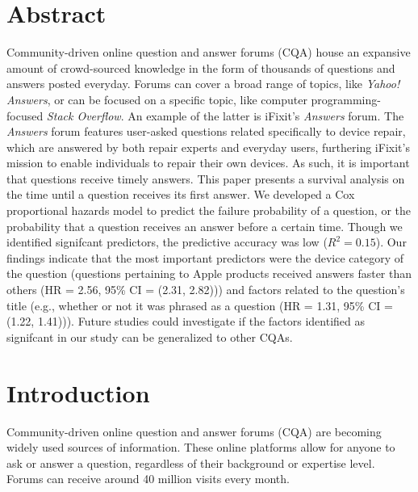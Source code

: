 \documentclass{article}
\begin{document}




\section*{Abstract}

Community-driven online question and answer forums (CQA) house an expansive amount of crowd-sourced knowledge in the form of thousands of questions and answers posted everyday. Forums can cover a broad range of topics, like \textit{Yahoo! Answers}, or can be focused on a specific topic, like computer programming-focused \textit{Stack Overflow}. An example of the latter is iFixit's \textit{Answers} forum. The \textit{Answers} forum features user-asked questions related specifically to device repair, which are answered by both repair experts and everyday users, furthering iFixit's mission to enable individuals to repair their own devices. As such, it is important that questions receive timely answers. This paper presents a survival analysis on the time until a question receives its first answer. We developed a Cox proportional hazards model to predict the failure probability of a question, or the probability that a question receives an answer before a certain time. Though we identified signifcant predictors, the predictive accuracy was low ($R^2 = 0.15$). Our findings indicate that the most important predictors were the device category of the question (questions pertaining to Apple products received answers faster than others (HR = 2.56, 95\% CI = (2.31, 2.82))) and factors related to the question's title (e.g., whether or not it was phrased as a question (HR = 1.31, 95\% CI = (1.22, 1.41))). Future studies could investigate if the factors identified as signifcant in our study can be generalized to other CQAs. 


\section*{Introduction}

Community-driven online question and answer forums (CQA) are becoming widely used sources of information. These online platforms allow for anyone to ask or answer a question, regardless of their background or expertise level. Forums can receive around 40 million visits every month.
    
\end{document}
